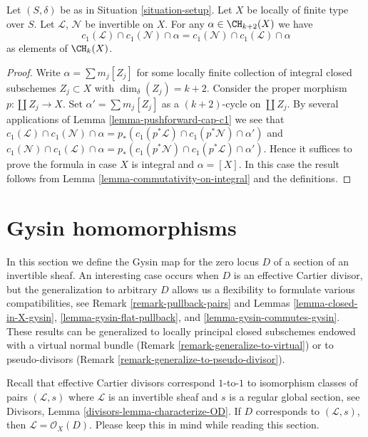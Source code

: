\begin{lemma}
\label{lemma-cap-commutative}
Let $(S, \delta)$ be as in Situation \ref{situation-setup}.
Let $X$ be locally of finite type over $S$.
Let $\mathcal{L}$, $\mathcal{N}$ be invertible on $X$.
For any $\alpha \in \CH_{k + 2}(X)$ we have
$$
c_1(\mathcal{L}) \cap c_1(\mathcal{N}) \cap \alpha
=
c_1(\mathcal{N}) \cap c_1(\mathcal{L}) \cap \alpha
$$
as elements of $\CH_k(X)$.
\end{lemma}

\begin{proof}
Write $\alpha = \sum m_j[Z_j]$ for some locally finite
collection of integral closed subschemes $Z_j \subset X$
with $\dim_\delta(Z_j) = k + 2$.
Consider the proper morphism $p : \coprod Z_j \to X$.
Set $\alpha' = \sum m_j[Z_j]$ as a $(k + 2)$-cycle on
$\coprod Z_j$. By several applications of
Lemma \ref{lemma-pushforward-cap-c1} we see that
$c_1(\mathcal{L}) \cap c_1(\mathcal{N}) \cap \alpha
= p_*(c_1(p^*\mathcal{L}) \cap c_1(p^*\mathcal{N}) \cap \alpha')$
and
$c_1(\mathcal{N}) \cap c_1(\mathcal{L}) \cap \alpha
= p_*(c_1(p^*\mathcal{N}) \cap c_1(p^*\mathcal{L}) \cap \alpha')$.
Hence it suffices to prove the formula in case $X$ is integral
and $\alpha = [X]$. In this case the result follows
from Lemma \ref{lemma-commutativity-on-integral} and the definitions.
\end{proof}






\section{Gysin homomorphisms}
\label{section-intersecting-effective-Cartier}

\noindent
In this section we define the Gysin map for the zero locus $D$ of a
section of an invertible sheaf. An interesting case occurs when $D$
is an effective Cartier divisor, but the generalization to arbitrary $D$
allows us a flexibility to formulate various compatibilities, see
Remark \ref{remark-pullback-pairs} and
Lemmas \ref{lemma-closed-in-X-gysin}, \ref{lemma-gysin-flat-pullback}, and
\ref{lemma-gysin-commutes-gysin}.
These results can be generalized to locally principal closed subschemes
endowed with a virtual normal bundle
(Remark \ref{remark-generalize-to-virtual}) or to
pseudo-divisors (Remark \ref{remark-generalize-to-pseudo-divisor}).

\medskip\noindent
Recall that effective Cartier divisors correspond $1$-to-$1$ to
isomorphism classes of pairs $(\mathcal{L}, s)$ where $\mathcal{L}$
is an invertible sheaf and $s$ is a regular global section, see
Divisors, Lemma \ref{divisors-lemma-characterize-OD}.
If $D$ corresponds to $(\mathcal{L}, s)$, then
$\mathcal{L} = \mathcal{O}_X(D)$. Please keep this in mind while
reading this section.

